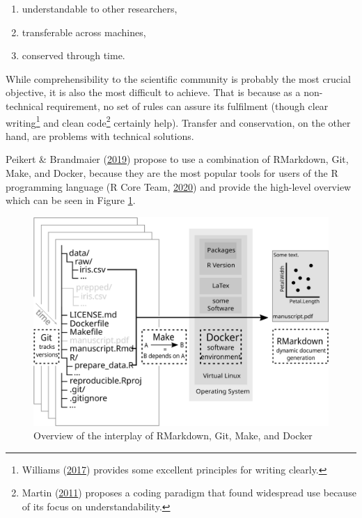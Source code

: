 \documentclass[12pt,a4paper,twoside]{article}
\providecommand{\tightlist}{%
  \setlength{\itemsep}{0pt}\setlength{\parskip}{0pt}}
\begin{document}
\begin{enumerate}
\def\labelenumi{\arabic{enumi}.}
\tightlist
\item
  understandable to other researchers,
\item
  transferable across machines,
\item
  conserved through time.
\end{enumerate}

While comprehensibility to the scientific community is probably the most crucial objective, it is also the most difficult to achieve.
That is because as a non-technical requirement, no set of rules can assure its fulfilment (though clear writing\footnote{Williams (\protect\hyperlink{ref-williamsStyleLessonsClarity2017}{2017}) provides some excellent principles for writing clearly.} and clean code\footnote{Martin (\protect\hyperlink{ref-martinCleanCoderCode2011}{2011}) proposes a coding paradigm that found widespread use because of its focus on understandability.} certainly help).
Transfer and conservation, on the other hand, are problems with technical solutions.

Peikert \& Brandmaier (\protect\hyperlink{ref-peikertReproducibleDataAnalysis2019}{2019}) propose to use a combination of RMarkdown, Git, Make, and Docker, because they are the most popular tools for users of the R programming language (R Core Team, \protect\hyperlink{ref-R-base}{2020}) and provide the high-level overview which can be seen in Figure \ref{fig:nutshell}.

\begin{figure}

{\centering \includegraphics[width=1\linewidth]{images/nutshell} 

}

\caption{Overview of the interplay of RMarkdown, Git, Make, and Docker}\label{fig:nutshell}
\end{figure}
\end{document}
